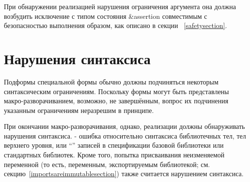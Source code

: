 При обнаружении реализацией нарушения ограничения аргумента она должна возбудить исключение
с типом состояния {\cf\&assertion} совместимым с безопасностью выполнения образом, как описано в
секции ~\ref{safetysection}.\vspace{3mm}

\section{Нарушения синтаксиса}\vspace{3mm}

Подформы специальной формы обычно должны подчиняться некоторым синтаксическим
ограничениям. Поскольку формы могут быть представлены макро-разворачиванием, возможно, не
завершённым, вопрос их подчинения указанным ограничениям неразрешим в принципе.

При окончании макро-разворачивания, однако, реализации должны обнаруживать нарушения
синтаксиса.  - ошибка относительно синтаксиса библиотечных тел,
тел верхнего уровня, или ``\exprtype'' записей в спецификации базовой библиотеки или
стандартных библиотек. Кроме того, попытка присваивания неизменяемой переменной (то есть,
переменным, экспортируемым библиотекой; см. секцию~\ref{importsareimmutablesection}) также
считается нарушением синтаксиса.

\newpage

